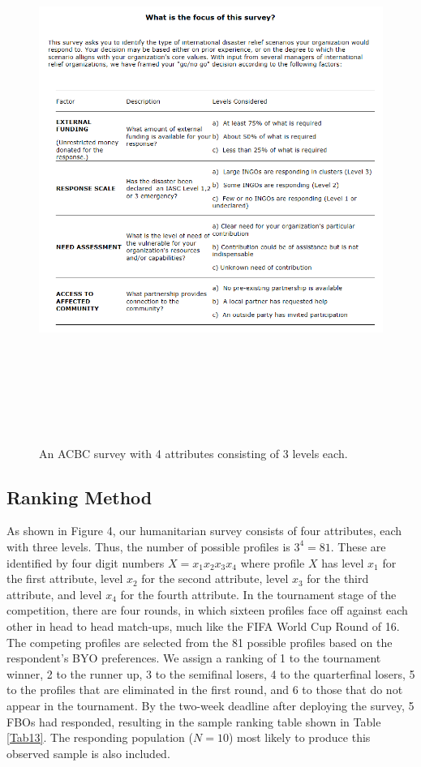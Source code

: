 \documentclass[a4paper, 12pt]{article}
\begin{document}
\begin{figure}[!htpb]
\centering
\includegraphics[width=5.75in, height=7in]{AttributeLevels.png}
\caption{{\small An ACBC survey with 4 attributes consisting of 3 levels each. }}
\label{AL}
\end{figure}



\subsection{Ranking Method}

As shown in Figure 4, our humanitarian survey consists of four attributes, each with three levels. Thus, the number of possible profiles is $3^4=81$. These are identified by four digit numbers $X=x_1x_2x_3x_4$ where profile $X$ has level $x_1$ for the first attribute, level $x_2$ for the second attribute, level $x_3$ for the third attribute, and level $x_4$ for the fourth attribute. In the tournament stage of the competition, there are four rounds, in which sixteen profiles face off against each other in head to head match-ups, much like the FIFA World Cup Round of 16. The competing profiles are selected from the 81 possible profiles based on the respondent's BYO preferences. We assign a ranking of 1 to the tournament winner, 2 to the runner up, 3 to the semifinal losers, 4 to the quarterfinal losers, 5 to the profiles that are eliminated in the first round, and 6 to those that do not appear in the tournament. By the two-week deadline after deploying the survey, 5 FBOs had responded, resulting in the sample ranking table shown in Table \ref{Tab13}. The responding population ($N=10$) most likely to produce this observed sample is also included.
\end{document}
